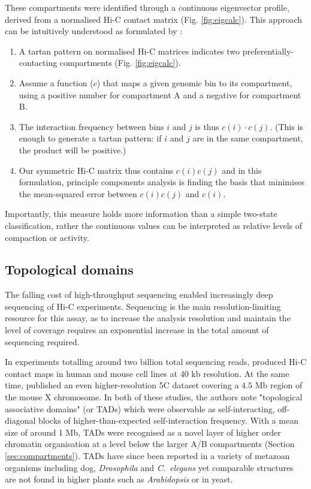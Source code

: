 \documentclass[a4paper,11pt,oneside]{book}
\begin{document}
These compartments were identified through a continuous eigenvector profile, derived from a normalised Hi-C contact matrix\cite{Lieberman2009} (Fig. \ref{fig:eigcalc}). This approach can be intuitively understood as formulated by \citet{Lajoie2014}:
\begin{enumerate}
\item A tartan pattern on normalised Hi-C matrices indicates two preferentially-contacting compartments (Fig. \ref{fig:eigcalc}).
\item Assume a function ($c$) that maps a given genomic bin to its compartment, using a positive number for compartment A and a negative for compartment B.
\item The interaction frequency between bins $i$ and $j$ is thus $c(i)\cdot c(j)$. (This is enough to generate a tartan pattern: if $i$ and $j$ are in the same compartment, the product will be positive.\cite{Lajoie2014})
\item Our symmetric Hi-C matrix thus contains $c(i)c(j)$ and in this formulation, principle components analysis is finding the basis that minimises the mean-squared error between $c(i)c(j)$ and $c(i)$.
\end{enumerate}
Importantly, this measure holds more information than a simple two-state classification, rather the continuous values can be interpreted as relative levels of compaction or activity.\cite{Dekker2013, Imakaev2012}

\subsection{Topological domains}\label{intro:tads}

The falling cost of high-throughput sequencing enabled increasingly deep sequencing of Hi-C experiments. Sequencing is the main resolution-limiting resource for this assay, as to increase the analysis resolution and maintain the level of coverage requires an exponential increase in the total amount of sequencing required.\cite{Lieberman2009, Tanay2013}

In experiments totalling around two billion total sequencing reads, \citet{Dixon2012} produced Hi-C contact maps in human and mouse cell lines at 40 kb resolution. At the same time, \citet{Nora2012} published an even higher-resolution 5C dataset covering a $4.5$ Mb region of the mouse X chromosome. In both of these studies, the authors note "topological associative domains" (or TADs) which were observable as self-interacting, off-diagonal blocks of higher-than-expected self-interaction frequency. With a mean size of around 1 Mb, TADs were recognised as a novel layer of higher order chromatin organisation at a level below the larger A/B compartments (Section \ref{sec:compartments}). TADs have since been reported in a variety of metazoan organisms including dog,\cite{VietriRudan2015} \emph{Drosophila}\cite{Sexton2012, Hou2012} and \emph{C.~elegans}\cite{Crane2015} yet comparable structures are not found in higher plants such as \emph{Arabidopsis}\cite{Feng2014, Wang2015} or in yeast.\cite{Duan2010, Gong2015}
\end{document}
